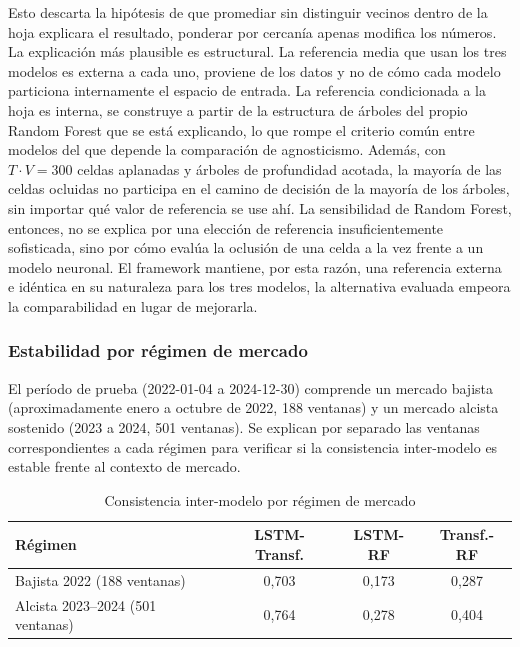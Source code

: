\documentclass[conference, letterpaper]{IEEEtran}
\begin{document}
Esto descarta la hipótesis de que promediar sin distinguir vecinos
dentro de la hoja explicara el resultado, ponderar por cercanía apenas
modifica los números. La explicación más plausible es estructural. La
referencia media que usan los tres modelos es externa a cada uno,
proviene de los datos y no de cómo cada modelo particiona internamente
el espacio de entrada. La referencia condicionada a la hoja es
interna, se construye a partir de la estructura de árboles del propio
Random Forest que se está explicando, lo que rompe el criterio común
entre modelos del que depende la comparación de agnosticismo. Además,
con $T \cdot V = 300$ celdas aplanadas y árboles de profundidad
acotada, la mayoría de las celdas ocluidas no participa en el camino
de decisión de la mayoría de los árboles, sin importar qué valor de
referencia se use ahí. La sensibilidad de Random Forest, entonces, no
se explica por una elección de referencia insuficientemente
sofisticada, sino por cómo evalúa la oclusión de una celda a la vez
frente a un modelo neuronal. El framework mantiene, por esta razón,
una referencia externa e idéntica en su naturaleza para los tres
modelos, la alternativa evaluada empeora la comparabilidad en lugar de
mejorarla.

\subsubsection{Estabilidad por régimen de mercado}

El período de prueba (2022-01-04 a 2024-12-30) comprende un mercado
bajista (aproximadamente enero a octubre de 2022, 188 ventanas) y un
mercado alcista sostenido (2023 a 2024, 501 ventanas). Se explican
por separado las ventanas correspondientes a cada régimen para
verificar si la consistencia inter-modelo es estable frente al
contexto de mercado.

\begin{table}[h]
\centering
\caption{Consistencia inter-modelo por régimen de mercado}
\label{tab:regimen}
\begin{tabular}{lccc}
\toprule
\textbf{Régimen} & \textbf{LSTM-Transf.} & \textbf{LSTM-RF} & \textbf{Transf.-RF} \\
\midrule
Bajista 2022 (188 ventanas)        & 0{,}703 & 0{,}173 & 0{,}287 \\
Alcista 2023--2024 (501 ventanas)  & 0{,}764 & 0{,}278 & 0{,}404 \\
\bottomrule
\end{tabular}
\end{table}
\end{document}
